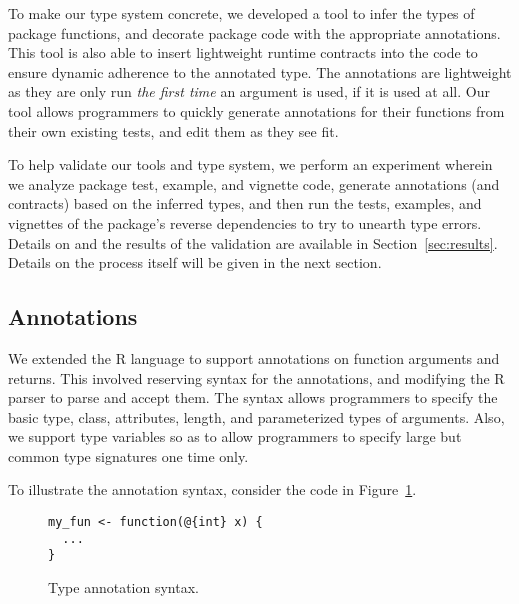 \documentclass[sigplan,10pt,review,anonymous]{acmart}\settopmatter{printfolios=true,printccs=false,printacmref=false}
\begin{document}
To make our type system concrete, we developed a tool to infer the types of package functions, and decorate package code with the appropriate annotations.
This tool is also able to insert lightweight runtime contracts into the code to ensure dynamic adherence to the annotated type.
The annotations are lightweight as they are only run {\it the first time} an argument is used, if it is used at all.
Our tool allows programmers to quickly generate annotations for their functions from their own existing tests, and edit them as they see fit.

To help validate our tools and type system, we perform an experiment wherein we analyze package test, example, and vignette code, generate annotations (and contracts) based on the inferred types, and then run the tests, examples, and vignettes of the package's reverse dependencies to try to unearth type errors.
Details on and the results of the validation are available in Section~\ref{sec:results}.
Details on the process itself will be given in the next section.

%
%
%
%
\subsection{Annotations}
\label{subsec:annotations}

We extended the R language to support annotations on function arguments and returns.
This involved reserving syntax for the annotations, and modifying the R parser to parse and accept them.
The syntax allows programmers to specify the basic type, class, attributes, length, and parameterized types of arguments.
Also, we support type variables so as to allow programmers to specify large but common type signatures one time only.

To illustrate the annotation syntax, consider the code in Figure~\ref{fig:annotation-syntax}.

\begin{figure}[!hb]{\small\begin{lstlisting}[style=R]
my_fun <- function(@{int} x) {
  ...
}
\end{lstlisting}}\caption{Type annotation syntax.}\label{fig:annotation-syntax}\end{figure}
\end{document}
